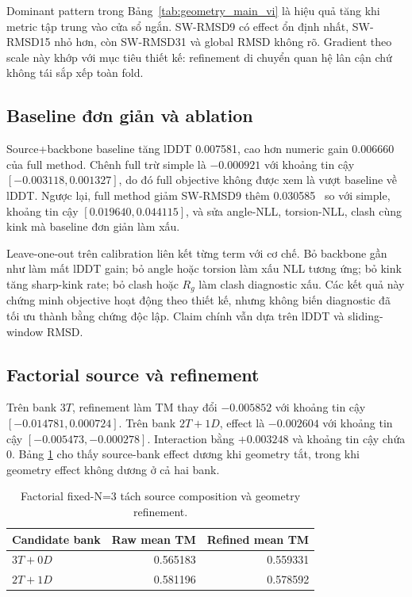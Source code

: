 \documentclass[12pt,a4paper,oneside]{report}
\newcommand{\angstrom}{\text{\AA}}
\begin{document}
Dominant pattern trong Bảng~\ref{tab:geometry_main_vi} là hiệu quả tăng khi metric tập
trung vào cửa sổ ngắn. SW-RMSD9 có effect ổn định nhất, SW-RMSD15 nhỏ hơn, còn SW-RMSD31
và global RMSD không rõ. Gradient theo scale này khớp với mục tiêu thiết kế: refinement
di chuyển quan hệ lân cận chứ không tái sắp xếp toàn fold.

\subsection{Baseline đơn giản và ablation}

Source+backbone baseline tăng lDDT 0.007581, cao hơn numeric gain 0.006660 của full
method. Chênh full trừ simple là $-0.000921$ với khoảng tin cậy
$[-0.003118,0.001327]$, do đó full objective không được xem là vượt baseline về lDDT.
Ngược lại, full method giảm SW-RMSD9 thêm 0.030585~\angstrom{} so với simple, khoảng tin
cậy $[0.019640,0.044115]$, và sửa angle-NLL, torsion-NLL, clash cùng kink mà baseline
đơn giản làm xấu.

Leave-one-out trên calibration liên kết từng term với cơ chế. Bỏ backbone gần như làm
mất lDDT gain; bỏ angle hoặc torsion làm xấu NLL tương ứng; bỏ kink tăng sharp-kink rate;
bỏ clash hoặc $R_g$ làm clash diagnostic xấu. Các kết quả này chứng minh objective hoạt
động theo thiết kế, nhưng không biến diagnostic đã tối ưu thành bằng chứng độc lập. Claim
chính vẫn dựa trên lDDT và sliding-window RMSD.

\subsection{Factorial source và refinement}

Trên bank $3T$, refinement làm TM thay đổi $-0.005852$ với khoảng tin cậy
$[-0.014781,0.000724]$. Trên bank $2T+1D$, effect là $-0.002604$ với khoảng tin cậy
$[-0.005473,-0.000278]$. Interaction bằng $+0.003248$ và khoảng tin cậy chứa 0. Bảng
\ref{tab:factorial_vi} cho thấy source-bank effect dương khi geometry tắt, trong khi
geometry effect không dương ở cả hai bank.

\begin{table}[H]
\centering
\caption{Factorial fixed-N=3 tách source composition và geometry refinement.}
\label{tab:factorial_vi}
\begin{tabular}{lrr}
\toprule
Candidate bank & Raw mean TM & Refined mean TM \\
\midrule
$3T+0D$ & 0.565183 & 0.559331 \\
$2T+1D$ & 0.581196 & 0.578592 \\
\bottomrule
\end{tabular}
\end{table}
\end{document}
